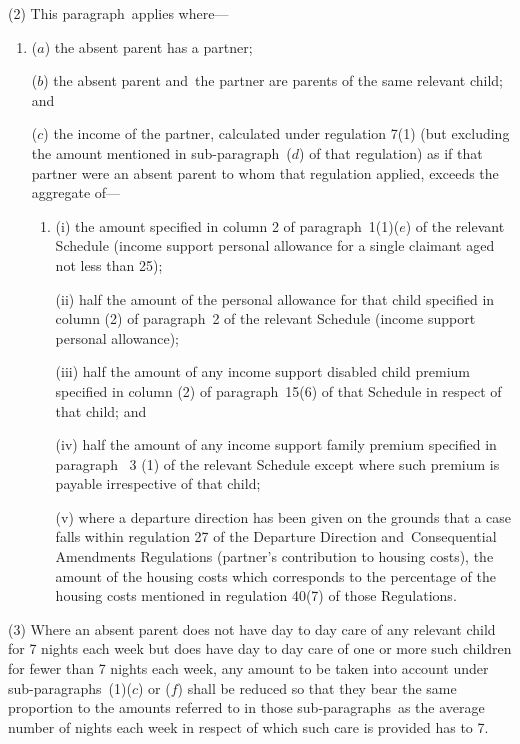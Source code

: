\documentclass[12pt,a4paper]{article}
\begin{document}
(2) This paragraph~applies where—
\begin{enumerate}\item[]
($a$) the absent parent has a partner;

($b$) the absent parent and~the partner are parents of the same relevant child; and

($c$) the income of the partner, calculated under regulation 7(1) 
(but excluding the amount mentioned in sub-paragraph~($d$) of that regulation) %
as if that partner were an absent parent to whom that regulation applied, exceeds the aggregate of—
\begin{enumerate}\item[]
(i) the amount specified in column 2 of paragraph~1(1)($e$) of the relevant Schedule (income support personal allowance for a single claimant aged not less than 25);

(ii) half the amount of the personal allowance for that child specified in column (2) of paragraph~2 of the relevant Schedule (income support personal allowance);

(iii) half the amount of any income support disabled child premium specified in column (2) of paragraph~15(6) of that Schedule in respect of that child;
and~%

(iv) half the amount of any income support family premium specified in paragraph~
3%
  (1) %
of the relevant Schedule  %
except where such premium is payable irrespective of that child;%

(v) where a departure direction has been given on the grounds that a case falls
within regulation 27 of the Departure Direction and~Consequential Amendments
Regulations (partner’s contribution to housing costs), the amount of the housing
costs which corresponds to the percentage of the housing costs mentioned in
regulation 40(7) of those Regulations.
\end{enumerate}
\end{enumerate}

(3) Where an absent parent does not have day to day care of any relevant child for 7 nights each week but does have day to day care of one or more such children for fewer than 7 nights each week, 
any amount  %
to be taken into account under sub-paragraphs~(1)($c$) 
or ($f$)  %
shall be reduced so that they bear the same proportion to the amounts referred to in those sub-paragraphs~as the average number of nights each week in respect of which such care is provided has to 7.
\end{document}
